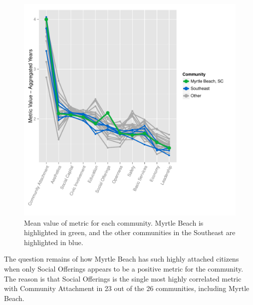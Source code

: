 \documentclass[11pt]{article}\usepackage{knitr}
\begin{document}
\begin{knitrout}
\color{fgcolor}\begin{figure}[H]


{\centering \includegraphics[width=\maxwidth]{figure/southeast_one} 

}

\caption[Mean value of metric for each community]{Mean value of metric for each community. Myrtle Beach is highlighted in green, and the other communities in the Southeast are highlighted in blue.\label{fig:southeast_one}}
\end{figure}


\end{knitrout}


The question remains of how Myrtle Beach has such highly attached citizens when only Social Offerings appears to be a positive metric for the community. The reason is that Social Offerings is the single most highly correlated metric with Community Attachment in 23 out of the 26 communities, including Myrtle Beach.
\end{document}
